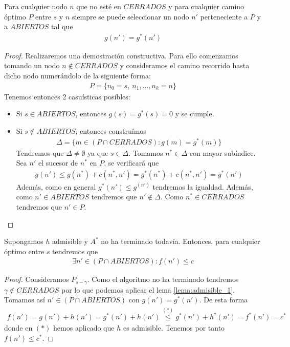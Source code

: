 \begin{lema}\label{lema:admisible_1}
    Para cualquier nodo $n$ que no esté en $CERRADOS$ y para cualquier camino óptimo $P$ entre $s$ y $n$ siempre se puede seleccionar un nodo $n'$ perteneciente a $P$ y a $ABIERTOS$ tal que 
    \begin{gather*}
        g(n') = g^*(n')
    \end{gather*}

    \begin{proof}
        Realizaremos una demostración constructiva. Para ello comenzamos tomando un nodo $n\notin CERRADOS$ y consideramos el camino recorrido hasta dicho nodo numerándolo de la siguiente forma:
        \begin{gather*}
            P = \{n_0=s,\ n_1,..., n_k = n\}
        \end{gather*}
        Tenemos entonces 2 casuísticas posibles: 
        \begin{itemize}
            \item Si $s\in ABIERTOS$, entonces $g(s) = g^*(s) = 0$ y se cumple.
            \item Si $s\notin ABIERTOS$, entonces construímos
            \begin{gather*}
                \Delta = \{m\in (P\cap CERRADOS) : g(m) = g^*(m)\}
            \end{gather*}
            Tendremos que $\Delta \neq \emptyset$ ya que $s\in \Delta$. Tomamos $n^*\in \Delta$ con mayor subíndice. Sea $n'$ el sucesor de $n^*$ en $P$, se verificará que 
            \begin{gather*}
                g(n') \leq g(n^*) +c(n^*, n') = g^*(n^*) +c(n^*, n') = g^*(n')
            \end{gather*}
            Además, como en general $g^*(n') \leq g^(n')$ tendremos la igualdad. Además, como $n'\in ABIERTOS$ tendremos que $n'\notin \Delta$. Como $n^*\in CERRADOS$ tendremos que $n'\in P$.
        \end{itemize}
    \end{proof}
\end{lema}

\begin{lema}\label{lema:admisible_2}
    Supongamos $h$ admisible y $A^*$ no ha terminado todavía. Entonces, para cualquier óptimo entre $s$ tendremos que 
    \begin{gather*}
        \exists n' \in (P \cap ABIERTOS) : f(n') \leq c
    \end{gather*} 

    \begin{proof}
        Consideramos $P_{s-\gamma}$. Como el algoritmo no ha terminado tendremos $\gamma \notin CERRADOS$ por lo que podemos aplicar el lema \ref{lema:admisible_1}. Tomamos así $n'\in (P \cap ABIERTOS)$ con $g(n') = g^*(n')$. De esta forma
        \begin{gather*}
            f(n') = g(n') + h(n') = g^*(n') + h(n') \overset{(\ast)}{\leq} g^*(n') + h^*(n') = f^*(n') = c^*
        \end{gather*}
        donde en $(\ast)$ hemos aplicado que $h$ es admisible. Tenemos por tanto $f(n')\leq c^*$.
    \end{proof}
\end{lema}

